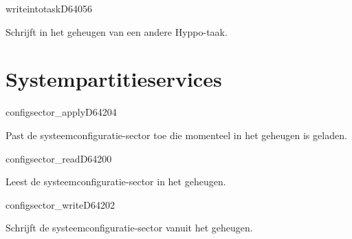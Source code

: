 \newpage
\begin{hyppotrap}{writeintotask}{D640}{56}
\item [Dienst:]  Schrijft in het geheugen van een andere Hyppo-taak.
\notimplemented
\end{hyppotrap}



\newpage
\section{Systempartitieservices}


\begin{hyppotrap}{configsector\_apply}{D642}{04}

\item [Dienst:]  Past de systeemconfiguratie-sector toe die momenteel in het geheugen is geladen.
\item [Geschiedenis:]
\end{hyppotrap}


\begin{hyppotrap}{configsector\_read}{D642}{00}

\item [Dienst:]  Leest de systeemconfiguratie-sector in het geheugen.
\item [Geschiedenis:]
\end{hyppotrap}


\begin{hyppotrap}{configsector\_write}{D642}{02}

\item [Dienst:]  Schrijft de systeemconfiguratie-sector vanuit het geheugen.
\item [Geschiedenis:]
\end{hyppotrap}


